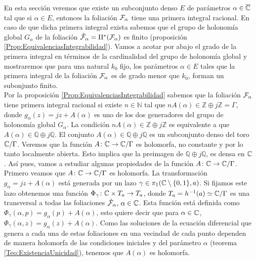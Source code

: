 En esta sección veremos que existe un subconjunto denso $E$ de parámetros $\alpha\in\overline{\mathbb{C}}$ tal que si $\alpha\in E$, entonces la foliación $\mathcal{F}_{\alpha}$ tiene una primera integral racional. En caso de que dicha primera integral exista sabemos que el grupo de holonomía global $G_{\alpha}$ de la foliación $\tilde{\mathcal{F}}_{\alpha}=\Pi^{*}(\mathcal{F}_{\alpha})$ es finito (proposición \ref{Prop:EquivalenciasIntegrabilidad}). Vamos a acotar por abajo el grado de la primera integral en términos de la cardinalidad del grupo de holonomía global y mostraremos que para una natural $k_{0}$ fijo, los parámetros $\alpha\in E$ tales que la primera integral de la foliación $\mathcal{F}_{\alpha}$ es de grado menor que $k_{0}$, forman un subonjunto finito.\\

Por la proposición \ref{Prop:EquivalenciasIntegrabilidad} sabemos que la foliación $\mathcal{F}_{\alpha}$ tiene primera integral racional si existe $n\in\mathbb{N}$ tal que $nA(\alpha)\in\mathbb{Z}\oplus j\mathbb{Z}=\Gamma$, donde $g_{\alpha}(z)=jz+A(\alpha)$ es uno de los dos generadores del grupo de holonomía global $G_{\alpha}$. La condición $nA(\alpha)\in\mathbb{Z}\oplus j\mathbb{Z}$ es equivalente a que $A(\alpha)\in\mathbb{Q}\oplus j\mathbb{Q}$. El conjunto $A(\alpha)\in\mathbb{Q}\oplus j\mathbb{Q}$ es un subconjunto denso del toro $\mathbb{C}/\Gamma$. Veremos que la función $A\colon\mathbb{C}\rightarrow\mathbb{C}/\Gamma$ es holomorfa, no constante y por lo tanto localmente abierta. Esto implica que la preimagen de $\mathbb{Q}\oplus j\mathbb{Q}$, es densa en $\mathbb{C}$. Así pues, vamos a estudiar algunas propiedades de la función $A\colon\mathbb{C}\rightarrow \mathbb{C}/\Gamma$.\\

Primero veamos que $A\colon\mathbb{C}\rightarrow\mathbb{C}/\Gamma$ es holomorfa. La transformación $g_{\alpha}=jz+A(\alpha)$ está generada por un lazo $\gamma\in\pi_{1}(\mathbb{C}\setminus\{0,1\},a)$. Si fijamos este lazo obtenemos una función $\Phi_{\gamma}\colon\mathbb{C}\times T_{a}\rightarrow T_{a}$, donde $T_{a}=h^{-1}(a)\simeq\mathbb{C}/\Gamma$ es una transversal a todas las foliaciones $\tilde{\mathcal{F}}_{\alpha},\, \alpha\in\mathbb{C}$. Esta función está definida como $\Phi_{\gamma}(\alpha,p)=g_{\alpha}(p)+A(\alpha)$, esto quiere decir que para $\alpha\in\mathbb{C}$, $\Phi_{\gamma}(\alpha,z)=g_{\alpha}(z)+A(\alpha)$. Como las soluciones de la ecuación diferencial que genera a cada una de estas foliaciones en una vecindad de cada punto dependen de manera holomorfa de las condiciones iniciales y del parámetro $\alpha$ (teorema \ref{Teo:ExistenciaUnicidad}), tenemos que $A(\alpha)$ es holomorfa.\\

